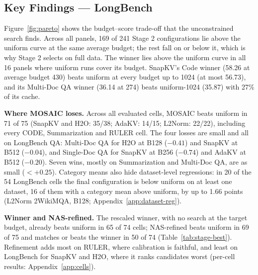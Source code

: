 \documentclass[11pt]{article}
\begin{document}
\subsection{Key Findings — LongBench}
\label{sec:which-stage}

Figure~\ref{fig:pareto} shows the budget--score trade-off that the unconstrained search finds. Across all panels, 169 of 241 Stage 2 configurations lie above the uniform curve at the same average budget; the rest fall on or below it, which is why Stage 2 selects on full data. The winner lies above the uniform curve in all 16 panels where uniform runs cover its budget. SnapKV's Code winner (58.26 at average budget 430) beats uniform at every budget up to 1024 (at most 56.73), and its Multi-Doc QA winner (36.14 at 274) beats uniform-1024 (35.87) with 27\% of its cache.

\textbf{Where MOSAIC loses.} Across all evaluated cells, MOSAIC beats uniform in 71 of 75 (SnapKV and H2O: 35/38; AdaKV: 14/15; L2Norm: 22/22), including every CODE, Summarization and RULER cell. The four losses are small and all on LongBench QA: Multi-Doc QA for H2O at B128 ($-0.41$) and SnapKV at B512 ($-0.04$), and Single-Doc QA for SnapKV at B256 ($-0.74$) and AdaKV at B512 ($-0.20$). Seven wins, mostly on Summarization and Multi-Doc QA, are as small ($<+0.25$). Category means also hide dataset-level regressions: in 20 of the 54 LongBench cells the final configuration is below uniform on at least one dataset, 16 of them with a category mean above uniform, by up to 1.66 points (L2Norm 2WikiMQA, B128; Appendix~\ref{app:dataset-reg}).

\textbf{Winner and NAS-refined.} The rescaled winner, with no search at the target budget, already beats uniform in 65 of 74 cells; NAS-refined beats uniform in 69 of 75 and matches or beats the winner in 50 of 74 (Table~\ref{tab:stage-best}). Refinement adds most on RULER, where calibration is faithful, and least on LongBench for SnapKV and H2O, where it ranks candidates worst (per-cell results: Appendix~\ref{app:cells}).
\end{document}
